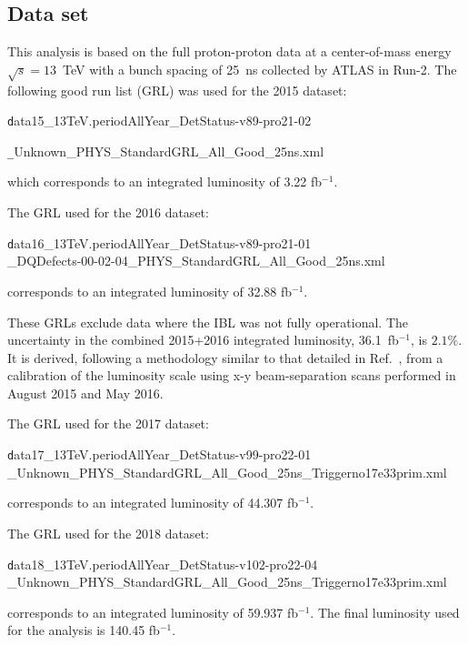 \subsection{Data set}
\label{sec:dataset}

This analysis is based on the full proton-proton data at a center-of-mass energy $\sqrt{s}=13$~TeV with a bunch spacing of 25~ns collected by ATLAS in Run-2. The following good run list (GRL) was used for the 2015 dataset:

\begin{centering}
{\texttt data15\_13TeV.periodAllYear\_DetStatus-v89-pro21-02}

{\texttt \_Unknown\_PHYS\_StandardGRL\_All\_Good\_25ns.xml}

\end{centering}
which corresponds to an integrated luminosity of 3.22 fb$^{-1}$.

The GRL used for the 2016 dataset:

\begin{centering}
{\texttt data16\_13TeV.periodAllYear\_DetStatus-v89-pro21-01\\\_DQDefects-00-02-04\_PHYS\_StandardGRL\_All\_Good\_25ns.xml}

\end{centering}
corresponds to an integrated luminosity of 32.88 fb$^{-1}$.

These GRLs exclude data where the IBL was not fully operational. The uncertainty in the combined 2015+2016 integrated luminosity, 36.1~fb$^{-1}$, is $2.1\%$. It is derived, following a methodology similar to that detailed in Ref.~\cite{DAPR-2013-01}, from a calibration of the luminosity scale using x-y beam-separation scans performed in August 2015 and May 2016.

The GRL used for the 2017 dataset:

\begin{centering}
{\texttt data17\_13TeV.periodAllYear\_DetStatus-v99-pro22-01\\\_Unknown\_PHYS\_StandardGRL\_All\_Good\_25ns\_Triggerno17e33prim.xml}

\end{centering}
corresponds to an integrated luminosity of 44.307 fb$^{-1}$.

The GRL used for the 2018 dataset:

\begin{centering}
{\texttt  data18\_13TeV.periodAllYear\_DetStatus-v102-pro22-04\\\_Unknown\_PHYS\_StandardGRL\_All\_Good\_25ns\_Triggerno17e33prim.xml}

\end{centering}
corresponds to an integrated luminosity of 59.937 fb$^{-1}$. The final luminosity used for the analysis is 140.45 fb$^{-1}$.

